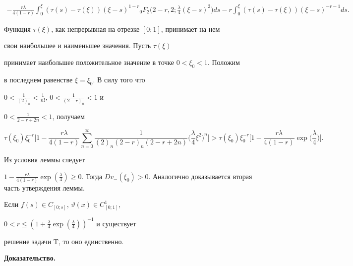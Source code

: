 \begin{pf}
\begin{multline*}
-\frac{r\lambda}{4(1-r)}\int^\xi_0(\tau(s)-\tau(\xi))(\xi-s)^{1-r} 


{}_0F_2\bigg(2-r,2;\frac{\lambda}{4}(\xi-s)^2\bigg)ds- 


r\int^\xi_0(\tau(s)-\tau(\xi))(\xi-s)^{-r-1}ds. 


\end{multline*} 


Функция $\tau(\xi)$, как непрерывная на отрезке $[0;1]$, принимает на нем


свои наибольшее и наименьшее значения. Пусть $\tau(\xi)$ 


принимает наибольшее положительное значение в точке $0<\xi_0<1$. Положим 


в последнем равенстве $\xi=\xi_0$. В силу того что 


$0<\frac{1}{(2)_n}<\frac{1}{n!}$, $0<\frac{1}{(2-r)_n}<1$ и 


$0<\frac{1}{2-r+2n}<1$, получаем 


$$ 


\tau(\xi_0)\xi^{-r}_0\bigg[1-\frac{r\lambda}{4(1-r)} 


\sum^\infty_{n=0}\frac{1}{(2)_n(2-r)_n(2-r+2n)} 


\bigg(\frac{\lambda}{4}\xi^2\bigg)^n\bigg]> 


\tau(\xi_0)\xi^{-r}_0\bigg[1-\frac{r\lambda}{4(1-r)} 


\exp\bigg(\frac{\lambda}{4} \bigg)\bigg]. 


$$ 


Из условия леммы следует 


$1-\frac{r\lambda}{4(1-r)}\exp(\frac{\lambda}{4})\ge0$. Тогда $D 


v_-(\xi_0)>0$. Аналогично доказывается вторая часть утверждения леммы. 


\end{pf} 


 


\begin{thm} 


Если $f(s)\in C_{[0;s]}$, $\vartheta(x)\in C^1_{[0;1]}$, 


$0<r\le(1+\frac{\lambda}{4}\exp(\frac{\lambda}{4}))^{-1}$ и существует 


решение задачи T, то оно единственно. 


\end{thm} 


 


{\bf Доказательство.}


